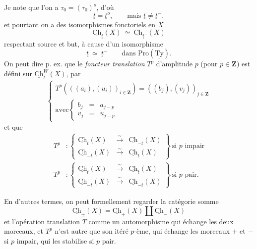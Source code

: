 \documentclass[11pt]{article}
\newcommand{\printedpage}[1]{\marginpar{\footnotesize p.~#1}}
\newcommand{\msp}[1]{\marginpar{\footnotesize [#1]}}
\newcommand{\Ch}{\underline{\mathrm{Ch}}}
\newcommand{\Ty}{\underline{\mathrm{Ty}}}
\begin{document}
Je note que l'on a $\tau_0 = (\tau_0)^o$, d'où
\[
\underline{t} = \underline{t}^o, \qquad \text{mais } \underline{t} \neq \underline{t}^-,
\]
et pourtant on a des isomorphismes fonctoriels en $X$
\[
\Ch_{\underline{t}}(X) \ \simeq \ \Ch_{\underline{t}^-}(X)
\]
respectant source et but, à cause d'un isomorphisme
\[
\underline{t} \ \simeq \ \underline{t}^- \qquad \text{dans Pro}(\Ty).
\]
On peut dire p. ex. que le \textit{foncteur translation} $T^p$ d'amplitude $p$ (pour $p \in \mathbf{Z}$) est défini sur $\Ch^{W}_{\underline{t}}(X)$, par
\[
\left\{ \begin{array}{l}
T^p(((a_i),(u_i))_{i \in \mathbf{Z}}) = ((b_j),(v_j))_{j \in \mathbf{Z}} \\[1ex]
\text{avec} \left\{ \begin{array}{lcl} b_j & = & a_{j-p} \\[1ex] v_j & = & u_{j-p} \end{array} \right.
\end{array} \right.
\]
et que
\[
\begin{aligned}
T^p &: \left\{ \begin{array}{lcl} \Ch_{t}(X) & \xrightarrow{\sim} & \Ch_{-t}(X) \\[1ex] \Ch_{-t}(X) & \xrightarrow{\sim} & \Ch_{t}(X) \end{array} \right\} \ \text{si } p \text{ impair} \\
T^p &: \left\{ \begin{array}{lcl} \Ch_{t}(X) & \xrightarrow{\sim} & \Ch_{t}(X) \\[1ex] \Ch_{-t}(X) & \xrightarrow{\sim} & \Ch_{-t}(X) \end{array} \right\} \ \text{si } p \text{ pair.}
\end{aligned} %
\]

\msp{page 148}
En d'autres termes, on peut formellement regarder la catégorie somme
\[
\Ch_{\pm}(X) = \Ch_{+}(X) \amalg \Ch_{-}(X)
\]
et l'opération translation $T$ comme un automorphisme qui échange les deux morceaux, et $T^p$ n'est autre que son itéré $p$-ème, qui échange les morceaux $+$ et $-$ si $p$ impair, qui les stabilise si $p$ pair.

\printedpage{93}
\end{document}
